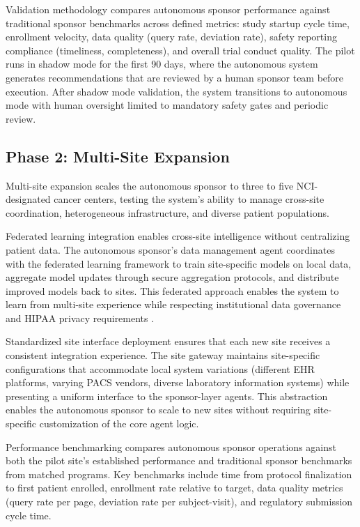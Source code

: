 Validation methodology compares autonomous sponsor performance against traditional sponsor
benchmarks across defined metrics: study startup cycle time, enrollment velocity, data
quality (query rate, deviation rate), safety reporting compliance (timeliness, completeness),
and overall trial conduct quality. The pilot runs in shadow mode for the first 90 days,
where the autonomous system generates recommendations that are reviewed by a human sponsor
team before execution. After shadow mode validation, the system transitions to autonomous
mode with human oversight limited to mandatory safety gates and periodic review.

\subsection{Phase 2: Multi-Site Expansion}

Multi-site expansion scales the autonomous sponsor to three to five NCI-designated cancer
centers, testing the system's ability to manage cross-site coordination, heterogeneous
infrastructure, and diverse patient populations.

Federated learning integration enables cross-site intelligence without centralizing
patient data. The autonomous sponsor's data management agent coordinates with the
federated learning framework to train site-specific models on local data, aggregate model
updates through secure aggregation protocols, and distribute improved models back to
sites. This federated approach enables the system to learn from multi-site experience
while respecting institutional data governance and HIPAA privacy requirements \cite{hipaa}.

Standardized site interface deployment ensures that each new site receives a consistent
integration experience. The site gateway maintains site-specific configurations that
accommodate local system variations (different EHR platforms, varying PACS vendors,
diverse laboratory information systems) while presenting a uniform interface to the
sponsor-layer agents. This abstraction enables the autonomous sponsor to scale to new
sites without requiring site-specific customization of the core agent logic.

Performance benchmarking compares autonomous sponsor operations against both the pilot
site's established performance and traditional sponsor benchmarks from matched programs.
Key benchmarks include time from protocol finalization to first patient enrolled,
enrollment rate relative to target, data quality metrics (query rate per page, deviation
rate per subject-visit), and regulatory submission cycle time.

